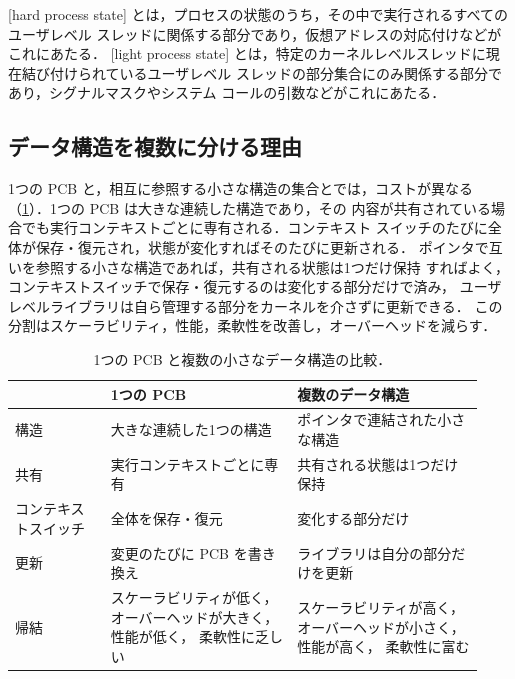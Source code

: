 \documentclass[../main.tex]{subfiles}
\begin{document}
\begin{definition}[ハードプロセス状態とライトプロセス状態]
  [hard process state]%
  とは，プロセスの状態のうち，その中で実行されるすべてのユーザレベル
  スレッドに関係する部分であり，仮想アドレスの対応付けなどがこれにあたる．
  [light process state]%
  とは，特定のカーネルレベルスレッドに現在結び付けられているユーザレベル
  スレッドの部分集合にのみ関係する部分であり，シグナルマスクやシステム
  コールの引数などがこれにあたる．
\end{definition}

\subsection{データ構造を複数に分ける理由}

1つの PCB と，相互に参照する小さな構造の集合とでは，コストが異なる
（\cref{tab:l05-rationale}）．1つの PCB は大きな連続した構造であり，その
内容が共有されている場合でも実行コンテキストごとに専有される．コンテキスト
スイッチのたびに全体が保存・復元され，状態が変化すればそのたびに更新される．
ポインタで互いを参照する小さな構造であれば，共有される状態は1つだけ保持
すればよく，コンテキストスイッチで保存・復元するのは変化する部分だけで済み，
ユーザレベルライブラリは自ら管理する部分をカーネルを介さずに更新できる．
この分割はスケーラビリティ，性能，柔軟性を改善し，オーバーヘッドを減らす．

\begin{table}[htbp]
  \centering
  \caption{1つの PCB と複数の小さなデータ構造の比較．}
  \label{tab:l05-rationale}
  \small
  \begin{tabular}{@{}>{\raggedright\arraybackslash}p{0.19\linewidth}>{\raggedright\arraybackslash}p{0.37\linewidth}>{\raggedright\arraybackslash}p{0.37\linewidth}@{}}
    \toprule
    & 1つの PCB & 複数のデータ構造 \\
    \midrule
    構造 & 大きな連続した1つの構造
         & ポインタで連結された小さな構造 \\
    \addlinespace
    共有 & 実行コンテキストごとに専有
         & 共有される状態は1つだけ保持 \\
    \addlinespace
    コンテキスト\newline スイッチ & 全体を保存・復元
         & 変化する部分だけ \\
    \addlinespace
    更新 & 変更のたびに PCB を書き換え
         & ライブラリは自分の部分だけを更新 \\
    \midrule
    帰結 & スケーラビリティが低く，オーバーヘッドが大きく，性能が低く，
           柔軟性に乏しい
         & スケーラビリティが高く，オーバーヘッドが小さく，性能が高く，
           柔軟性に富む \\
    \bottomrule
  \end{tabular}
\end{table}
\end{document}
